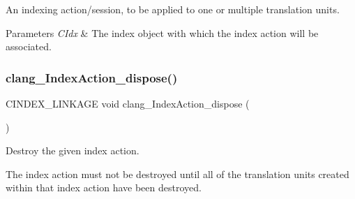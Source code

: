 An indexing action/session, to be applied to one or multiple translation units. 


\begin{DoxyParams}{Parameters}
{\em C\+Idx} & The index object with which the index action will be associated. \\
\hline
\end{DoxyParams}
\mbox{\label{group__CINDEX__HIGH_ga9b648aa6e87ea8d29dd0d4f0f592ffbb}} 
\subsubsection{\texorpdfstring{clang\+\_\+\+Index\+Action\+\_\+dispose()}{clang\_IndexAction\_dispose()}}
{\footnotesize\ttfamily C\+I\+N\+D\+E\+X\+\_\+\+L\+I\+N\+K\+A\+GE void clang\+\_\+\+Index\+Action\+\_\+dispose (\begin{DoxyParamCaption}\item[{\hyperlink{group__CINDEX__HIGH_gac8d30d3e3fb34d887b611e7c6de3afb6}{C\+X\+Index\+Action}}]{ }\end{DoxyParamCaption})}



Destroy the given index action. 

The index action must not be destroyed until all of the translation units created within that index action have been destroyed. \mbox{\label{group__CINDEX__HIGH_ga340d2dda7a0d3430fe9929034c1b712c}} 
